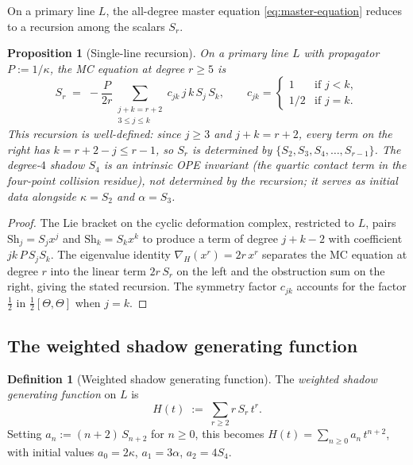 \documentclass[11pt]{article}
\theoremstyle{plain}
\newtheorem{proposition}[theorem]{Proposition}
\theoremstyle{definition}
\newtheorem{definition}[theorem]{Definition}
\theoremstyle{remark}
\begin{document}
On a primary line $L$, the all-degree master equation
\eqref{eq:master-equation} reduces to a recursion among the scalars
$S_r$.

\begin{proposition}[Single-line recursion]
\label{prop:single-line-recursion}
On a primary line $L$ with propagator $P := 1/\kappa$,
the MC equation at degree $r \geq 5$ is
\begin{equation}
\label{eq:single-line-recursion}
 S_r
 \;=\;
 -\frac{P}{2r}
 \sum_{\substack{j + k = r + 2 \\ 3 \leq j \leq k}}
 c_{jk}\, j\, k\, S_j \, S_k,
 \qquad
 c_{jk} =
 \begin{cases}
 1 & \text{if } j < k, \\
 1/2 & \text{if } j = k.
 \end{cases}
\end{equation}
This recursion is well-defined: since $j \geq 3$ and $j + k = r + 2$,
every term on the right has $k = r + 2 - j \leq r - 1$, so $S_r$
is determined by $\{S_2, S_3, S_4, \ldots, S_{r-1}\}$.
The degree-$4$ shadow $S_4$ is an intrinsic OPE invariant (the quartic
contact term in the four-point collision residue), not determined by
the recursion; it serves as initial data alongside $\kappa = S_2$
and $\alpha = S_3$.
\end{proposition}

\begin{proof}
The Lie bracket on the cyclic deformation complex, restricted to
$L$, pairs $\mathrm{Sh}_j = S_j x^j$ and
$\mathrm{Sh}_k = S_k x^k$ to produce a term of degree $j + k - 2$
with coefficient $jk\,P\,S_j S_k$. The eigenvalue identity
$\nabla_H(x^r) = 2r \, x^r$ separates the MC equation at
degree $r$ into the linear term $2r \, S_r$ on the left and the
obstruction sum on the right, giving the stated recursion.
The symmetry factor $c_{jk}$ accounts for the factor
$\tfrac{1}{2}$ in $\tfrac{1}{2}[\Theta, \Theta]$ when $j = k$.
\end{proof}

\subsection{The weighted shadow generating function}

\begin{definition}[Weighted shadow generating function]
\label{def:shadow-gf}
The \emph{weighted shadow generating function} on $L$ is
\begin{equation}
\label{eq:shadow-gf}
 H(t) \;:=\; \sum_{r \geq 2} r \, S_r \, t^r.
\end{equation}
Setting $a_n := (n+2)\,S_{n+2}$ for $n \geq 0$, this becomes
$H(t) = \sum_{n \geq 0} a_n \, t^{n+2}$, with initial values
$a_0 = 2\kappa$, $a_1 = 3\alpha$, $a_2 = 4S_4$.
\end{definition}
\end{document}
